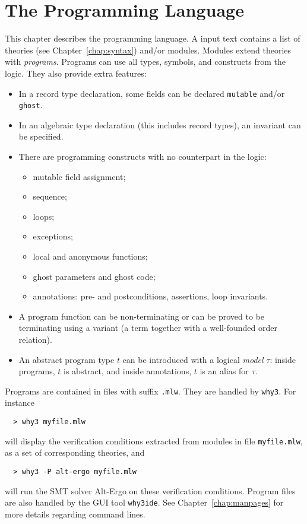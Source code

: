 \chapter{The \whyml Programming Language}
\label{chap:whyml}

This chapter describes the \whyml programming language.
A \whyml input text contains a list of theories (see
Chapter~\ref{chap:syntax}) and/or modules.
Modules extend theories with \emph{programs}.
Programs can use all types, symbols, and constructs from the logic.
They also provide extra features:
\begin{itemize}
\item
  In a record type declaration, some fields can be declared
  \texttt{mutable} and/or \texttt{ghost}.
\item
  In an algebraic type declaration (this includes record types), an
  invariant can be specified.
\item
  There are programming constructs with no counterpart in the logic:
  \begin{itemize}
  \item mutable field assignment;
  \item sequence;
  \item loops;
  \item exceptions;
  \item local and anonymous functions;
  \item ghost parameters and ghost code;
  \item annotations: pre- and postconditions, assertions, loop invariants.
  \end{itemize}
\item
  A program function can be non-terminating or can be proved
  to be terminating using a variant (a term together with a well-founded
  order relation).
\item
  An abstract program type $t$ can be introduced with a logical
  \emph{model} $\tau$: inside programs, $t$ is abstract, and inside
  annotations, $t$ is an alias for $\tau$.
\end{itemize}
%
Programs are contained in files with suffix \verb|.mlw|.
They are handled by \texttt{why3}. For instance
\begin{verbatim}
  > why3 myfile.mlw
\end{verbatim}
will display the verification conditions extracted from modules in
file \texttt{myfile.mlw}, as a set of corresponding theories, and
\begin{verbatim}
  > why3 -P alt-ergo myfile.mlw
\end{verbatim}
will run the SMT solver Alt-Ergo on these verification conditions.
Program files are also handled by the GUI tool \texttt{why3ide}.
See Chapter~\ref{chap:manpages} for more details regarding command lines.

